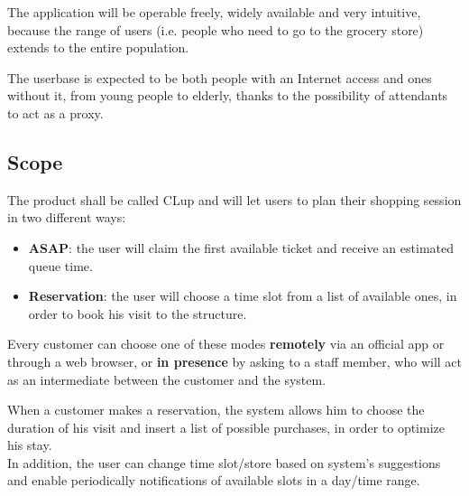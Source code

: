 \documentclass[12pt]{article}
\begin{document}
The application will be operable freely, widely available and very intuitive, because the range of users (i.e. people who need to go to the grocery store) extends to the entire population.

The userbase is expected to be both people with an Internet access and ones without it, from young people to elderly, thanks to the possibility of attendants to act as a proxy.

\subsection{Scope}
The product shall be called CLup and will let users to plan their shopping session in two different ways:
\begin{itemize}
    \item {\textbf{ASAP}: the user will claim the first available ticket and receive an estimated queue time.}
    \item {\textbf{Reservation}: the user will choose a time slot from a list of available ones, in order to book his visit to the structure.}
\end{itemize}

Every customer can choose one of these modes \textbf{remotely} via an official app or through a web browser, or \textbf{in presence} by asking to a staff member, who will act as an intermediate between the customer and the system.

When a customer makes a reservation, the system allows him to choose the duration of his visit and insert a list of possible purchases, in order to optimize his stay.\\

In addition, the user can change time slot/store based on system's suggestions and enable periodically notifications of available slots in a day/time range.
\end{document}
